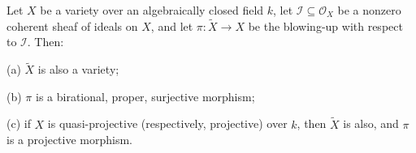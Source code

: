 Let $X$ be a variety over an algebraically closed field $k$, let $\mathcal{I} \subseteq \mathcal{O}_X$ be a nonzero coherent sheaf of ideals on $X$, and let $\pi: \tilde{X} \to X$ be the blowing-up with respect to $\mathcal{I}$. Then:

(a) $\tilde{X}$ is also a variety;

(b) $\pi$ is a birational, proper, surjective morphism;

(c) if $X$ is quasi-projective (respectively, projective) over $k$, then $\tilde{X}$ is also, and $\pi$ is a projective morphism.
